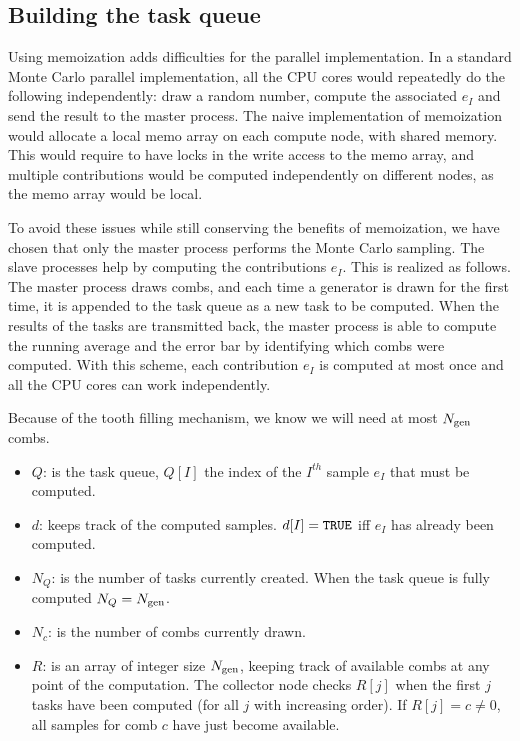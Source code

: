 \documentclass[./thesis.tex]{subfiles}
\begin{document}
\subsection{Building the task queue}
\label{sub:task_queue}

Using memoization adds difficulties for the parallel implementation.
In a standard Monte Carlo parallel implementation,
all the CPU cores would repeatedly do the following independently: 
draw a random number, compute the associated $e_I$ and send the result to the master process.
The naive implementation of memoization would allocate a local memo array on each compute node, with shared memory. This would require to have locks in the write access to the memo array, and multiple contributions would be computed independently on different nodes, as the memo array would be local.

To avoid these issues while still conserving the benefits of memoization, we have
chosen that only the master process performs the Monte Carlo sampling. The
slave processes help by computing the contributions $e_I$. This is realized as
follows. The master process draws combs, and each time a 
generator is drawn for the first time, it is appended to the task queue as a new
task to be computed. When the results of the tasks are transmitted back, the
master process is able to compute the running average and the error bar
by identifying which combs were computed.
With this scheme, each contribution $e_I$ is computed at most once and all
the CPU cores can work independently.

Because of the tooth filling mechanism, we know we will need at most ${N_\text{gen}}$ combs.
\begin{itemize}
\item $Q$: is the task queue, $Q[I]$ the index of the $I^{th}$ sample $e_I$ that must be computed.
\item $d$: keeps track of the computed samples. $d[I] = {\text{\texttt{TRUE}}}$ iff $e_I$ has already been computed.
\item $N_Q$: is the number of tasks currently created. When the task queue is fully computed $N_Q = {N_\text{gen}}$.
\item $N_c$: is the number of combs currently drawn.
\item $R$: is an array of integer size ${N_\text{gen}}$, keeping track of available combs at any point of the computation. The collector node checks $R[j]$ when the first $j$ tasks have been computed (for all $j$ with increasing order). If $R[j] = c \neq 0$, all samples for comb $c$ have just become available. 
\end{itemize}
\end{document}
